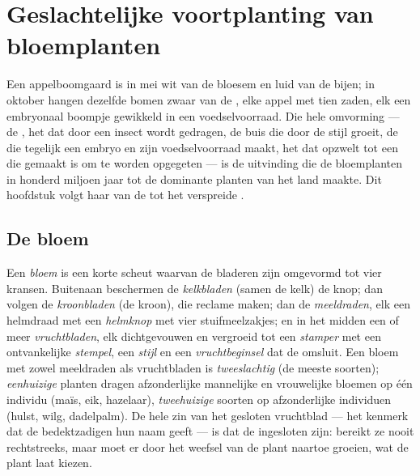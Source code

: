 \chapter{Geslachtelijke voortplanting van bloemplanten}\label{ch:b2:angiosperm-reproduction}

Een appelboomgaard is in mei wit van de bloesem en luid van de bijen; in
oktober hangen dezelfde bomen zwaar van de , elke appel met tien
zaden, elk  een embryonaal boompje gewikkeld in een voedselvoorraad.
Die hele omvorming --- de , het  dat door een insect wordt
gedragen, de buis die door de stijl groeit, de  die
tegelijk een embryo en zijn voedselvoorraad maakt, het  dat
opzwelt tot een  die gemaakt is om te worden opgegeten --- is de
uitvinding die de bloemplanten in honderd miljoen jaar tot de dominante
planten van het land maakte. Dit hoofdstuk volgt haar van de  tot het
verspreide .

\section{De bloem}

\begin{definition}\label{def:b2:angiosperm-reproduction:flower}
Een \emph{bloem} is een korte scheut waarvan de bladeren zijn omgevormd
tot vier kransen. Buitenaan beschermen de \emph{kelkbladen} (samen de
kelk) de knop; dan volgen de \emph{kroonbladen} (de kroon), die reclame
maken; dan de \emph{meeldraden}, elk een helmdraad met een \emph{helmknop}
met vier stuifmeelzakjes; en in het midden een of meer
\emph{vruchtbladen}, elk dichtgevouwen en vergroeid tot een
\emph{stamper} met een ontvankelijke \emph{stempel}, een \emph{stijl} en
een \emph{vruchtbeginsel} dat de \emph{} omsluit. Een bloem
met zowel meeldraden als vruchtbladen is \emph{tweeslachtig} (de meeste
soorten); \emph{eenhuizige} planten dragen afzonderlijke mannelijke en
vrouwelijke bloemen op één individu (maïs, eik, hazelaar),
\emph{tweehuizige} soorten op afzonderlijke individuen (hulst, wilg,
dadelpalm). De hele zin van het gesloten vruchtblad --- het kenmerk dat
de bedektzadigen hun naam geeft --- is dat de  ingesloten
zijn:  bereikt ze nooit rechtstreeks, maar moet er door het
weefsel van de plant naartoe groeien, wat de plant laat kiezen.
\end{definition}

